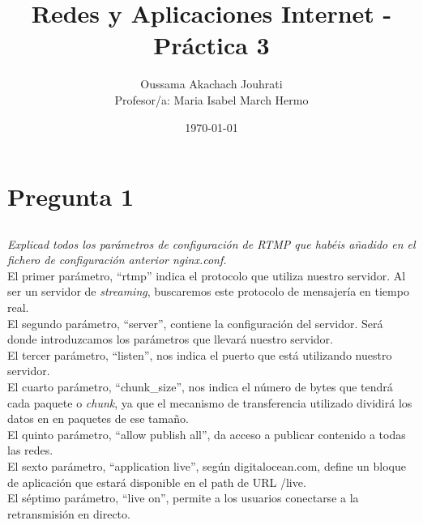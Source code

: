 \documentclass[spanish]{article}
\title{Redes y Aplicaciones Internet - Práctica 3}
\author{Oussama Akachach Jouhrati\\
[0.5cm]{\small Profesor/a: Maria Isabel March Hermo}}
\date{\today}
\begin{document}
\maketitle
\newpage

\tableofcontents
{}
\setcounter{page}{2}
\newpage



\section{Pregunta 1}

\subsection{}

\textit{Explicad todos los parámetros de configuración de
RTMP que habéis añadido en el fichero de configuración
anterior nginx.conf.}\\

El primer parámetro, ``rtmp'' indica el protocolo que
utiliza nuestro servidor. Al ser un servidor de
\textit{streaming}, buscaremos este protocolo de mensajería
en tiempo real.\\

El segundo parámetro, ``server'', contiene la configuración
del servidor. Será donde introduzcamos los parámetros que
llevará nuestro servidor.\\

El tercer parámetro, ``listen'', nos indica el puerto que
está utilizando nuestro servidor.\\

El cuarto parámetro, ``chunk\_size'', nos indica el número de
bytes que tendrá cada paquete o \textit{chunk}, ya que el
mecanismo de transferencia utilizado dividirá los datos en
en paquetes de ese tamaño.\\

El quinto parámetro, ``allow publish all'', da acceso a
publicar contenido a todas las redes.\\

El sexto parámetro, ``application live'', según
digitalocean.com, define un bloque de aplicación que estará
disponible en el path de URL /live.\\

El séptimo parámetro, ``live on'', permite a los usuarios
conectarse a la retransmisión en directo.\\
\end{document}
